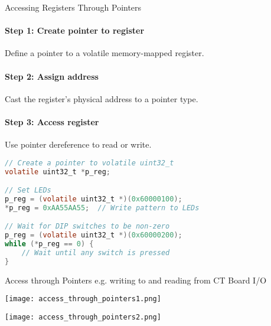 \begin{KR}{Accessing Registers Through Pointers}
\paragraph{Step 1: Create pointer to register}
Define a pointer to a volatile memory-mapped register.
\paragraph{Step 2: Assign address}
Cast the register's physical address to a pointer type.
\paragraph{Step 3: Access register}
Use pointer dereference to read or write.

\begin{lstlisting}[language=C, style=basesmol]
// Create a pointer to volatile uint32_t
volatile uint32_t *p_reg;

// Set LEDs
p_reg = (volatile uint32_t *)(0x60000100);
*p_reg = 0xAA55AA55;  // Write pattern to LEDs

// Wait for DIP switches to be non-zero
p_reg = (volatile uint32_t *)(0x60000200);
while (*p_reg == 0) {
    // Wait until any switch is pressed
}
\end{lstlisting}
\end{KR}

\begin{corollary}{Access through Pointers} e.g. writing to and reading from CT Board I/O

    \begin{minipage}{0.6\linewidth}
    \texttt{[image: access\_through\_pointers1.png]}
    \end{minipage}
    \begin{minipage}{0.2\linewidth}
    \texttt{[image: access\_through\_pointers2.png]}
    \end{minipage}
\end{corollary}

